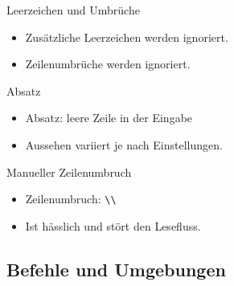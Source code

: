 \malte


\begin{Frame}[fragile]{Leerzeichen und Umbrüche}
  \begin{itemize}
    \item Zusätzliche \alert{Leerzeichen} werden ignoriert.
    \item \alert{Zeilenumbrüche} werden ignoriert.
  \end{itemize}

  \xxx

  \begin{exampleblock}{Absatz}
    \begin{itemize}
      \item \alert{Absatz}: leere Zeile in der Eingabe
      \item Aussehen variiert je nach Einstellungen.
    \end{itemize}
  \end{exampleblock}

  \xxx

  \begin{alertblock}{Manueller Zeilenumbruch}
    \begin{itemize}
      \item \alert{Zeilenumbruch}: \lstinline-\\-
      \item Ist \alert{hässlich} und \alert{stört} den Lesefluss.
    \end{itemize}
  \end{alertblock}
\end{Frame}

\subsection{Befehle und Umgebungen}

